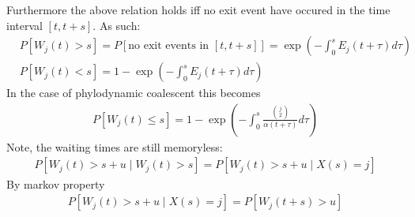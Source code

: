 \documentclass{report}
\theoremstyle{definition}
\begin{document}
Furthermore the above relation holds iff no exit event have occured in the time interval $[t,t+s]$. As such:
\begin{align*}
&P[W_j(t) > s] = P[\text{no exit events in }[t,t+s]] = \exp(-\int_0^{s}E_j(t+\tau)d\tau)\\
&P[W_j(t) < s] = 1 - \exp(-\int_0^{s}E_j(t+\tau)d\tau)
\end{align*}
In the case of phylodynamic coalescent this becomes
\begin{gather}
P[W_j(t) \leq s] = 1 - \exp(-\int_0^{s}\frac{\binom{j}{2}}{\alpha(t+\tau)}d\tau)
\end{gather}
Note, the waiting times are still memoryless:
\begin{gather}
P\left[W_j(t) > s+u\mid W_j(t)>s \right] = P\left[W_j(t) > s+u\mid X(s)=j\right]
\end{gather}
By markov property
\begin{gather}
P\left[W_j(t) > s+u\mid X(s)=j\right] = P\left[W_j(t+s) > u\right]
\end{gather}
\end{document}
